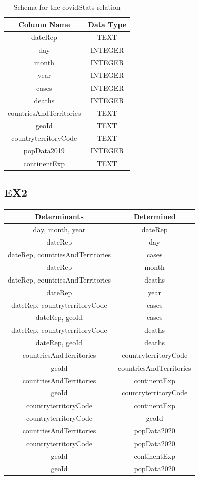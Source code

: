\documentclass[12pt,oneside,a4paper,english]{article}
\begin{document}
\newpage
\begin{table}[h]
\centering
\begin{tabular}{|c|c|}
\hline
\textbf{Column Name} & \textbf{Data Type} \\ \hline
dateRep & TEXT \\ \hline
day & INTEGER \\ \hline
month & INTEGER \\ \hline
year & INTEGER \\ \hline
cases & INTEGER \\ \hline
deaths & INTEGER \\ \hline
countriesAndTerritories & TEXT \\ \hline
geoId & TEXT \\ \hline
countryterritoryCode & TEXT \\ \hline
popData2019 & INTEGER \\ \hline
continentExp & TEXT \\ \hline
\end{tabular}
\caption{Schema for the covidStats relation}
\label{tab:covidStats_schema}
\end{table}


\subsection{EX2}
\begin{center}
\begin{tabular}{|c|c|}
\hline
\textbf{Determinants} & \textbf{Determined} \\
\hline
day, month, year & dateRep \\
\hline
dateRep & day \\
\hline
dateRep, countriesAndTerritories & cases \\
\hline
dateRep & month \\
\hline
dateRep, countriesAndTerritories & deaths \\
\hline
dateRep & year \\
\hline
dateRep, countryterritoryCode & cases \\
\hline
dateRep, geoId & cases \\
\hline
dateRep, countryterritoryCode & deaths \\
\hline
dateRep, geoId & deaths \\
\hline
countriesAndTerritories & countryterritoryCode \\
\hline
geoId & countriesAndTerritories \\
\hline
countriesAndTerritories & continentExp \\
\hline
geoId & countryterritoryCode \\
\hline
countryterritoryCode & continentExp \\
\hline
countryterritoryCode & geoId \\
\hline
countriesAndTerritories & popData2020 \\
\hline
countryterritoryCode & popData2020 \\
\hline
geoId & continentExp \\
\hline
geoId & popData2020 \\
\hline
\end{tabular}
\end{center}
\end{document}
